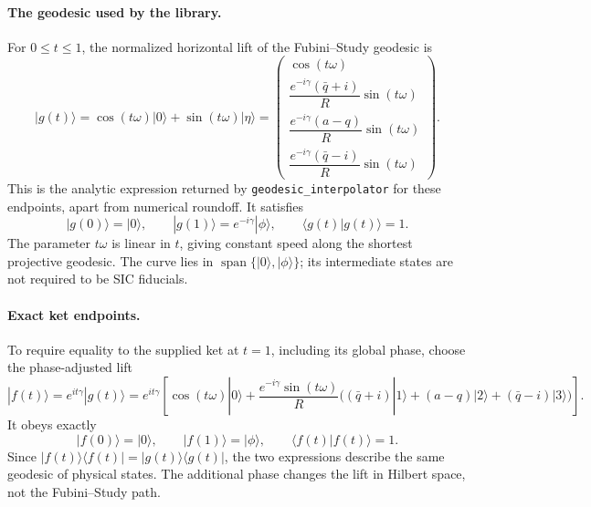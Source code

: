 \documentclass[11pt]{article}
\begin{document}
\paragraph{The geodesic used by the library.}
For $0\leq t\leq1$, the normalized horizontal lift of the
Fubini--Study geodesic is
\begin{equation}
 \boxed{
 |g(t)\rangle=\cos(t\omega)|0\rangle+\sin(t\omega)|\eta\rangle
 =\begin{pmatrix}
 \cos(t\omega)\\[2pt]
 \dfrac{e^{-i\gamma}(\bar q+i)}R\sin(t\omega)\\[5pt]
 \dfrac{e^{-i\gamma}(a-q)}R\sin(t\omega)\\[5pt]
 \dfrac{e^{-i\gamma}(\bar q-i)}R\sin(t\omega)
 \end{pmatrix}.}
\end{equation}
This is the analytic expression returned by
\texttt{geodesic\_interpolator} for these endpoints, apart from numerical
roundoff. It satisfies
\begin{equation}
 |g(0)\rangle=|0\rangle,\qquad
 |g(1)\rangle=e^{-i\gamma}|\phi\rangle,\qquad
 \langle g(t)|g(t)\rangle=1.
\end{equation}
The parameter $t\omega$ is linear in $t$, giving constant speed along the
shortest projective geodesic. The curve lies in
$\operatorname{span}\{|0\rangle,|\phi\rangle\}$; its intermediate states
are not required to be SIC fiducials.

\paragraph{Exact ket endpoints.}
To require equality to the supplied ket at $t=1$, including its global
phase, choose the phase-adjusted lift
\begin{equation}
 \boxed{
 |f(t)\rangle=e^{it\gamma}|g(t)\rangle
 =e^{it\gamma}\left[
 \cos(t\omega)|0\rangle+
 \frac{e^{-i\gamma}\sin(t\omega)}R
 \big((\bar q+i)|1\rangle+(a-q)|2\rangle+(\bar q-i)|3\rangle\big)
 \right].}
\end{equation}
It obeys exactly
\begin{equation}
 |f(0)\rangle=|0\rangle,\qquad |f(1)\rangle=|\phi\rangle,
 \qquad \langle f(t)|f(t)\rangle=1.
\end{equation}
Since $|f(t)\rangle\langle f(t)|=|g(t)\rangle\langle g(t)|$,
the two expressions describe the same geodesic of physical states.
The additional phase changes the lift in Hilbert space, not the
Fubini--Study path.
\end{document}
